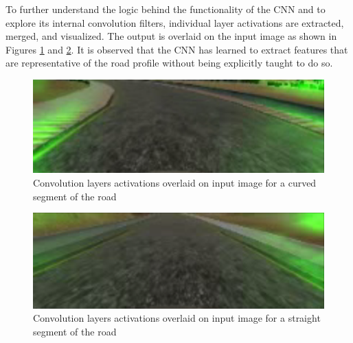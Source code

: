 To further understand the logic behind the functionality of the CNN and to explore its internal convolution filters, individual layer activations are extracted, merged, and visualized. The output is overlaid on the input image as shown in Figures \ref{activ} and \ref{activ_2}. It is observed that the CNN has learned to extract features that are representative of the road profile without being explicitly taught to do so.
\begin{figure}[htbp]
\centerline{\includegraphics[width=\linewidth]{Figures/activations.PNG}}
\caption{Convolution layers activations overlaid on input image for a curved segment of the road}
\label{activ}
\end{figure}
\begin{figure}[htbp]
\centerline{\includegraphics[width=\linewidth]{Figures/activations_2.PNG}}
\caption{Convolution layers activations overlaid on input image for a straight segment of the road}
\label{activ_2}
\end{figure}